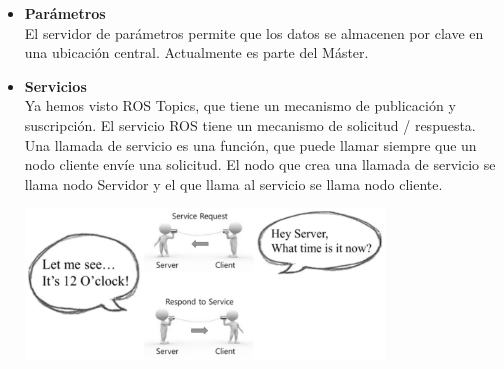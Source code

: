 \begin{itemize}
    \item \textbf{Parámetros}\\
    El servidor de parámetros permite que los datos se almacenen por clave en una
    ubicación central. Actualmente es parte del Máster.
    \item \textbf{Servicios}\\
    Ya hemos visto ROS Topics, que tiene un mecanismo de publicación y suscripción.
    El servicio ROS tiene un mecanismo de solicitud / respuesta. Una llamada de
    servicio es una función, que puede llamar siempre que un nodo cliente envíe una
    solicitud. El nodo que crea una llamada de servicio se llama nodo Servidor y el
    que llama al servicio se llama nodo cliente.~\cite{ROSLENTIN}
    \begin{center}
        \includegraphics[width=0.75\textwidth]{Capitulo2/Fig4.eps}
        \label{Fig4}
    \end{center}

\end{itemize}

